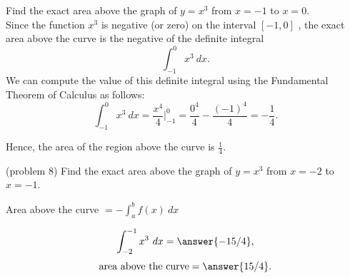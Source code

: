 \documentclass[handout]{ximera}
\begin{document}
\begin{example}[example 8]
Find the exact area above the graph of $y = x^3$ from $x = -1$ to $x = 0$. \\
Since the function $x^3$ is negative (or zero) on the interval $[-1, 0]$ , the exact area above the curve is the 
negative of the definite integral 
\[\int_{-1}^0 x^3 \ dx.\]
We can compute the value of this definite integral using the Fundamental Theorem of Calculus as follows:
\[\int_{-1}^0 x^3 \ dx = \frac{x^4}{4} \Big|_{-1}^0 = \frac{0^4}{4} - \frac{(-1)^4}{4} = -\frac14.\]

Hence, the area of the region above the curve is $\frac14$.


\begin{image}
\end{image}
\end{example}


\begin{problem}(problem 8)
Find the exact area above the graph of $y = x^3$ from $x = -2$ to $x = -1$. \\
\begin{hint}
Area above the curve $= -\int_a^b f(x) \ dx$
\end{hint}
\[\int_{-2}^{-1} x^3 \ dx = \answer{-15/4},\]
\[\text{area above the curve} = \answer{15/4}.\]
\end{problem}
\end{document}
